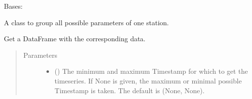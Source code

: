 \documentclass[letterpaper,10pt,english]{sphinxmanual}
\begin{document}

\begin{fulllineitems}
\label{\detokenize{weatherDB:weatherDB.station.GroupStation}}
\sphinxAtStartPar
Bases: 

\sphinxAtStartPar
A class to group all possible parameters of one station.

\begin{fulllineitems}
\label{\detokenize{weatherDB:weatherDB.station.GroupStation.__init__}}
\end{fulllineitems}


\begin{fulllineitems}
\label{\detokenize{weatherDB:weatherDB.station.GroupStation.get_df}}
\sphinxAtStartPar
Get a DataFrame with the corresponding data.
\begin{quote}\begin{description}
\item[{Parameters}] \leavevmode\begin{itemize}
\item {} 
\sphinxAtStartPar
{} (\sphinxstyleliteralemphasis{\sphinxupquote{, }}) \textendash{} The minimum and maximum Timestamp for which to get the timeseries.
If None is given, the maximum or minimal possible Timestamp is taken.
The default is (None, None).


\end{itemize}
\end{description}
\end{quote}
\end{fulllineitems}
\end{fulllineitems}
\end{document}
